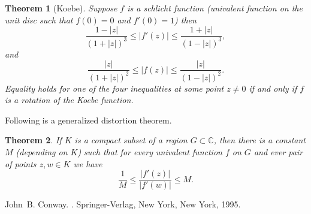 \documentclass[12pt]{article}
\theoremstyle{theorem}
\newtheorem*{thm}{Theorem}
\theoremstyle{definition}
\begin{document}
\begin{thm}[Koebe]
Suppose $f$ is a schlicht function (univalent function on the unit disc
such that $f(0) = 0$ and $f'(0) = 1$) then
\begin{equation*}
\frac{1-\lvert z \rvert}{(1+\lvert z \rvert)^3}
\leq
\lvert f'(z) \rvert
\leq
\frac{1+\lvert z \rvert}{(1-\lvert z \rvert)^3},
\end{equation*}
and
\begin{equation*}
\frac{\lvert z \rvert}{(1+\lvert z \rvert)^2}
\leq
\lvert f(z) \rvert
\leq
\frac{\lvert z \rvert}{(1-\lvert z \rvert)^2}.
\end{equation*}
Equality holds for one of the four inequalities at some point $z \not= 0$ if and only if $f$ is a rotation of the Koebe function.
\end{thm}

Following is a generalized distortion theorem.

\begin{thm}
If $K$ is a compact subset of a region $G \subset {\mathbb{C}}$, then there is a constant $M$ (depending on $K$) such that for every univalent function $f$
on $G$ and ever pair of points $z,w \in K$ we have
\begin{equation*}
\frac{1}{M}
\leq
\frac{\lvert f'(z) \rvert}{\lvert f'(w) \rvert}
\leq
M .
\end{equation*} 
\end{thm}

\begin{thebibliography}{9}
John~B. Conway.
{\em {}}.
Springer-Verlag, New York, New York, 1995.
\end{thebibliography}
\end{document}

